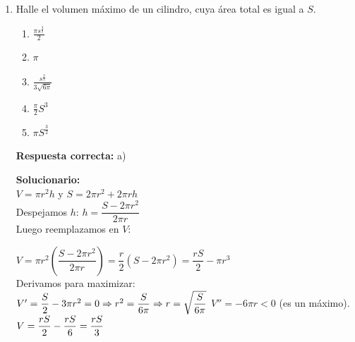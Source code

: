 \begin{enumerate}
	Comparando coeficientes:
	\begin{itemize}
		\item Para $x^2$: $A_1 = 0$
		\item Para $x$: $A_2 - 2A_1 = 1 \Rightarrow A_2 - 0 = 1 \Rightarrow A_2 = 1$
		\item Término independiente: $A_1 - A_2 + A_3 = 1 \Rightarrow 0 - 1 + A_3 = 1 \Rightarrow A_3 = 2$
	\end{itemize}
	Por lo tanto, .
	
	
	
	
	\item Halle el volumen máximo de un cilindro, cuya área total es igual a $S$.
	
	\begin{enumerate}[label=\alph*)]
		\item $\displaystyle\frac{\pi s^{\frac{3}{2}}}{2}$
		\item $\pi$
		\item $\displaystyle\frac{s^{\frac{3}{2}}}{3\sqrt{6\pi}}$
		\item $\displaystyle\frac{\pi}{2} S^3$
		\item $\pi S^{\frac{3}{2}}$
	\end{enumerate}
	
	\textbf{Respuesta correcta:} a)
	
	\vspace{2mm}
	\textbf{Solucionario:}\\
	$V = \pi r^2 h$ y $S = 2\pi r^2 + 2\pi r h$ \\
	
	Despejamos $h$: $h = \dfrac{S - 2\pi r^2}{2\pi r}$ \\
	
	Luego reemplazamos en $V$:
	
	$V = \pi r^2 \left( \dfrac{S - 2\pi r^2}{2\pi r} \right) = \dfrac{r}{2}(S - 2\pi r^2) = \dfrac{rS}{2} - \pi r^3 $\\
	
	Derivamos para maximizar:\\
	$V' = \dfrac{S}{2} - 3\pi r^2 = 0 \Rightarrow r^2 = \dfrac{S}{6\pi} \Rightarrow r = \sqrt{\dfrac{S}{6\pi}}\\ $
	 $V'' = -6\pi r < 0$ (es un máximo). \\
	 $V = \dfrac{rS}{2} - \dfrac{rS}{6} = \dfrac{rS}{3}\\$ 
	 \\
	
	
	\vspace{6mm}
	
\end{enumerate}


